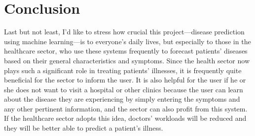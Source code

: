 \newpage

\section{Conclusion}
\label{chap:conclusion}
Last but not least, I'd like to stress how crucial this project—disease prediction using machine learning—is 
to everyone's daily lives, but especially to those in the healthcare sector, who use these systems frequently to forecast patients' diseases based on their general characteristics and symptoms. 
Since the health sector now plays such a significant role in treating patients' illnesses, it is frequently quite beneficial for the sector to inform the user. It is also helpful for the user if
 he or she does not want to visit a hospital or other clinics because the user can learn about the disease they are experiencing by simply entering the symptoms and any other pertinent information, and the sector can 
 also profit from this system. If the healthcare sector adopts this idea, doctors' workloads will be reduced and they will be better able to predict a patient's illness.


\newpage